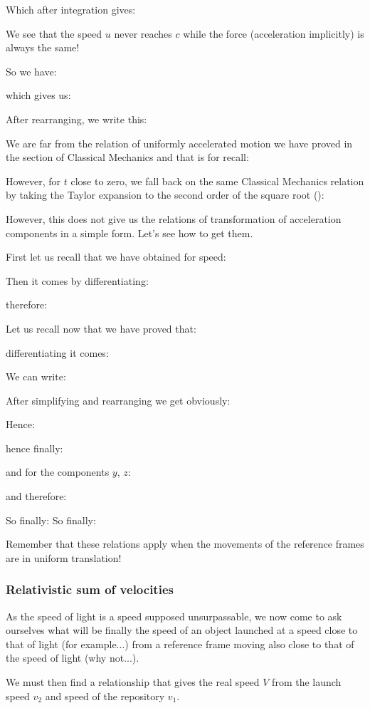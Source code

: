 	Which after integration gives:
	
	We see that the speed $u$ never reaches $c$ while the force (acceleration implicitly) is always the same!

	So we have:
	
	which gives us:
	
	After rearranging, we write this:
	
	We are far from the relation of uniformly accelerated motion we have proved in the section of Classical Mechanics and that is for recall:
	
	However, for $t$ close to zero, we fall back on the same Classical Mechanics relation by taking the Taylor expansion to the second order of the square root ():
	
	However, this does not give us the relations of transformation of acceleration components in a simple form. Let's see how to get them.

	First let us recall that we have obtained for speed:
	
	Then it comes by differentiating:
	
	therefore:
	
	Let us recall now that we have proved that:
	
	differentiating it comes:
	
	We can write:
	
	After simplifying and rearranging we get obviously:
	
	Hence:
	
	hence finally:
	
	and for the components $y$, $z$:
	
	and therefore:
	
	So finally:
	So finally:
	
	Remember that these relations apply when the movements of the reference frames are in uniform translation!
	
	\subsubsection{Relativistic sum of velocities}
	As the speed of light is a speed supposed unsurpassable, we now come to ask ourselves what will be finally the speed of an object launched at a speed close to that of light (for example...) from a reference frame moving also close to that of the speed of light (why not...).

	We must then find a relationship that gives the real speed $V$ from the launch speed $v_2$ and speed of the repository $v_1$.

